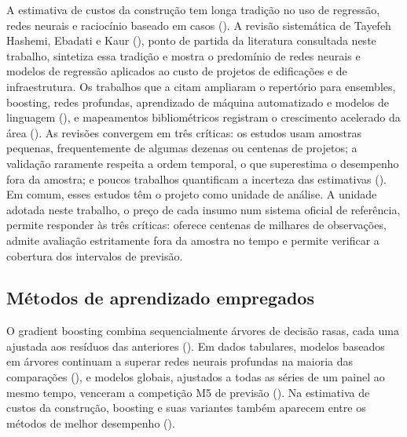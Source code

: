 A estimativa de custos da construção tem longa tradição no uso de regressão, redes neurais 
e raciocínio baseado em casos (). A revisão sistemática de Tayefeh Hashemi, Ebadati e 
Kaur (), ponto de partida da literatura consultada neste trabalho, sintetiza essa 
tradição e mostra o predomínio de redes neurais e modelos de regressão aplicados ao custo 
de projetos de edificações e de infraestrutura. Os trabalhos que a citam ampliaram o 
repertório para ensembles, boosting, redes profundas, aprendizado de máquina automatizado 
e modelos de linguagem (), e mapeamentos bibliométricos registram o crescimento 
acelerado da área ().
As revisões convergem em três críticas: os estudos usam amostras 
pequenas, frequentemente de algumas dezenas ou centenas de projetos; a validação 
raramente respeita a ordem temporal, o que superestima o desempenho fora da amostra; e 
poucos trabalhos quantificam a incerteza das estimativas (). Em comum, esses 
estudos têm o projeto como unidade de análise. A unidade adotada neste trabalho, o preço 
de cada insumo num sistema oficial de referência, permite responder às três críticas: 
oferece centenas de milhares de observações, admite avaliação estritamente fora da amostra 
no tempo e permite verificar a cobertura dos intervalos de previsão.


\subsection{Métodos de aprendizado empregados}

O gradient boosting combina sequencialmente árvores de decisão rasas, cada uma ajustada 
aos resíduos das anteriores (). Em dados tabulares, modelos baseados em 
árvores continuam a superar redes neurais profundas na maioria das comparações 
(), e modelos globais, ajustados a todas as séries 
de um painel ao mesmo tempo, venceram a competição M5 de previsão (). Na estimativa de custos da construção, boosting e suas variantes 
também aparecem entre os métodos de melhor desempenho ().

